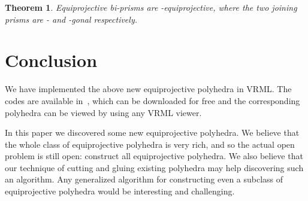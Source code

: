 \documentclass{article}
\newtheorem{theorem}{Theorem}
\begin{document}
\begin{theorem}
Equiprojective bi-prisms are -equiprojective, where the
two joining prisms are - and -gonal respectively.
\end{theorem}


\section{Conclusion}
We have implemented the above new equiprojective polyhedra in VRML.
The codes are available in~\cite{code10}, which can be downloaded for free
and the corresponding polyhedra can be viewed by using any VRML viewer.

In this paper we discovered some new equiprojective polyhedra.
We believe that the whole class of equiprojective polyhedra
is very rich, and so the actual open problem is still open: 
construct all equiprojective polyhedra.
We also believe that our technique of cutting and gluing existing polyhedra
may help discovering such an algorithm.
Any generalized algorithm for constructing even a subclass of equiprojective polyhedra
would be interesting and challenging.



\end{document}
